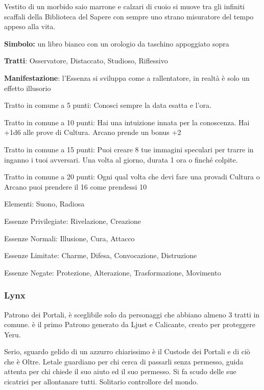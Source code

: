 \documentclass[a4paper,11pt,twoside,openany]{book}
\begin{document}
{Vestito di un morbido saio marrone e calzari di cuoio si muove tra gli infiniti scaffali della Biblioteca del Sapere con sempre uno strano misuratore del tempo appeso alla vita.

\textbf{Simbolo:} un libro bianco con un orologio da taschino appoggiato
sopra

\textbf{Tratti}: Osservatore, Distaccato, Studioso, Riflessivo

\textbf{Manifestazione}: l'Essenza si sviluppa come a rallentatore, in realtà è solo un effetto illusorio

\bigskip

Tratto in comune a 5 punti: Conosci sempre la data esatta e l'ora.

Tratto in comune a 10 punti: Hai una intuizione innata per la conoscenza. Hai +1d6 alle prove di Cultura. Arcano prende un bonus +2

Tratto in comune a 15 punti: Puoi creare 8 tue immagini speculari per trarre in inganno i tuoi avversari. Una volta al giorno, durata 1 ora o finché colpite.

Tratto in comune a 20 punti: Ogni qual volta che devi fare una provadi Cultura o Arcano puoi prendere il 16 come prendessi 10

\bigskip

Elementi: Suono, Radiosa

\bigskip

Essenze Privilegiate: Rivelazione, Creazione

Essenze Normali: Illusione, Cura, Attacco

Essenze Limitate: Charme, Difesa, Convocazione, Distruzione

Essenze Negate: Protezione, Alterazione, Trasformazione, Movimento

\subsubsection{Lynx}

\label{lynx}

Patrono dei Portali, è sceglibile solo da personaggi che abbiano almeno 3 tratti in comune. è il primo Patrono generato da Ljust e Calicante, creato per proteggere Yeru.

Serio, sguardo gelido di un azzurro chiarissimo è il Custode dei Portali e di ciò che è Oltre. Letale guardiano per chi cerca di passarli senza permesso, guida attenta per chi chiede il suo aiuto ed il suo permesso. Si fa scudo delle sue cicatrici per allontanare tutti. 
Solitario controllore del mondo.

}
\end{document}
